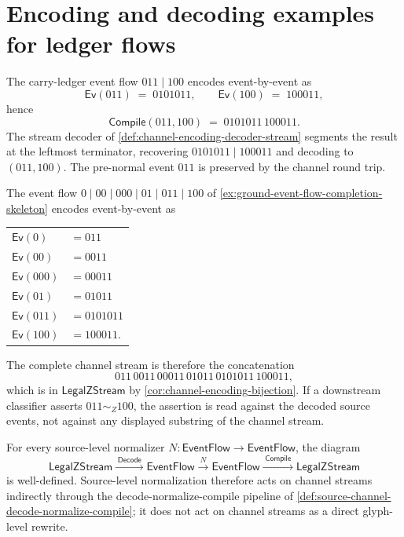 \section{Encoding and decoding examples for ledger flows}
\label{sec:source-channel-examples}

\begin{example}
\label{ex:source-channel-carry-ledger-encoding}
The carry-ledger event flow $011 \mid 100$ encodes event-by-event as
$$
  \mathsf{Ev}(011) \;=\; 0101011,
  \qquad
  \mathsf{Ev}(100) \;=\; 100011,
$$
hence
$$
  \mathsf{Compile}(011, 100) \;=\; 0101011\,100011.
$$
The stream decoder of \autoref{def:channel-encoding-decoder-stream} segments the result at the leftmost terminator, recovering $0101011 \mid 100011$ and decoding to $(011, 100)$. The pre-normal event $011$ is preserved by the channel round trip.
\end{example}

\begin{example}
\label{ex:source-channel-completion-with-carry}
The event flow $0 \mid 00 \mid 000 \mid 01 \mid 011 \mid 100$ of \autoref{ex:ground-event-flow-completion-skeleton} encodes event-by-event as
\begin{center}
\begin{tabular}{ll}
  $\mathsf{Ev}(0)$    & $= 011$ \\
  $\mathsf{Ev}(00)$   & $= 0011$ \\
  $\mathsf{Ev}(000)$  & $= 00011$ \\
  $\mathsf{Ev}(01)$   & $= 01011$ \\
  $\mathsf{Ev}(011)$  & $= 0101011$ \\
  $\mathsf{Ev}(100)$  & $= 100011$.
\end{tabular}
\end{center}
The complete channel stream is therefore the concatenation
$$
  011\,0011\,00011\,01011\,0101011\,100011,
$$
which is in $\mathsf{LegalZStream}$ by \autoref{cor:channel-encoding-bijection}. If a downstream classifier asserts $011 \sim_{Z} 100$, the assertion is read against the decoded source events, not against any displayed substring of the channel stream.
\end{example}

\begin{theorem}
\label{thm:source-channel-conservative-over-decoding}
For every source-level normalizer $N \colon \mathsf{EventFlow} \to \mathsf{EventFlow}$, the diagram
$$
  \mathsf{LegalZStream}
  \xrightarrow{\;\mathsf{Decode}\;}
  \mathsf{EventFlow}
  \xrightarrow{\;N\;}
  \mathsf{EventFlow}
  \xrightarrow{\;\mathsf{Compile}\;}
  \mathsf{LegalZStream}
$$
is well-defined. Source-level normalization therefore acts on channel streams indirectly through the decode-normalize-compile pipeline of \autoref{def:source-channel-decode-normalize-compile}; it does not act on channel streams as a direct glyph-level rewrite.
\end{theorem}

